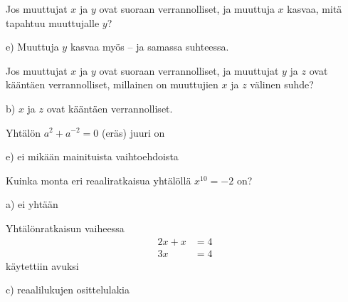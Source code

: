 \begin{tehtava}
Jos muuttujat $x$ ja $y$ ovat suoraan verrannolliset, ja muuttuja $x$ kasvaa, mitä tapahtuu muuttujalle $y$?
\begin{vastaus}
e) Muuttuja $y$ kasvaa myös -- ja samassa suhteessa.
\end{vastaus}
\end{tehtava}

\begin{tehtava}
Jos muuttujat $x$ ja $y$ ovat suoraan verrannolliset, ja muuttujat $y$ ja $z$ ovat kääntäen verrannolliset, millainen on muuttujien $x$ ja $z$ välinen suhde?
	\begin{vastaus}
b) $x$ ja $z$ ovat kääntäen verrannolliset.
	\end{vastaus}
\end{tehtava}

\begin{tehtava}
Yhtälön $a^2+a^{-2}=0$ (eräs) juuri on
	\begin{vastaus}
e) ei mikään mainituista vaihtoehdoista
	\end{vastaus}
\end{tehtava}

\begin{tehtava}
Kuinka monta eri reaaliratkaisua yhtälöllä $x^{10}=-2$ on?
	\begin{vastaus}
a) ei yhtään
	\end{vastaus}
\end{tehtava}

\begin{tehtava}
Yhtälönratkaisun vaiheessa
\begin{align*}
2x+x&=4 \\
3x&=4
\end{align*}
käytettiin avuksi
	\begin{vastaus}
	c) reaalilukujen osittelulakia
	\end{vastaus}
\end{tehtava}

